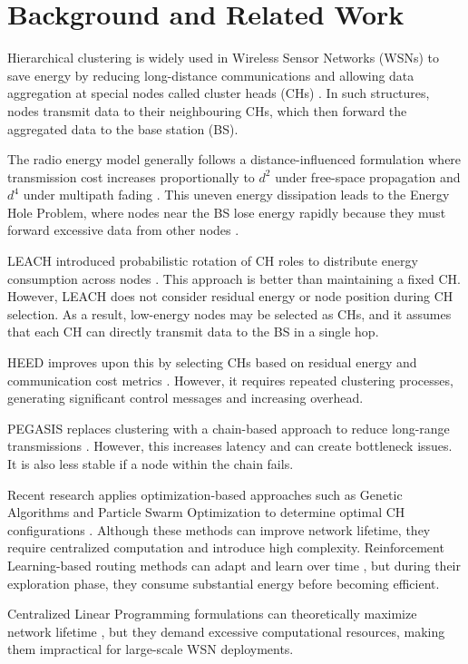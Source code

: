 \documentclass[conference]{IEEEtran}
\begin{document}
\section{Background and Related Work}

Hierarchical clustering is widely used in Wireless Sensor Networks (WSNs) to save energy by reducing long-distance communications and allowing data aggregation at special nodes called cluster heads (CHs) \cite{b5,b1}. In such structures, nodes transmit data to their neighbouring CHs, which then forward the aggregated data to the base station (BS). 

The radio energy model generally follows a distance-influenced formulation where transmission cost increases proportionally to $d^2$ under free-space propagation and $d^4$ under multipath fading \cite{b6}. This uneven energy dissipation leads to the Energy Hole Problem, where nodes near the BS lose energy rapidly because they must forward excessive data from other nodes \cite{b11}. 

LEACH introduced probabilistic rotation of CH roles to distribute energy consumption across nodes \cite{b6}. This approach is better than maintaining a fixed CH. However, LEACH does not consider residual energy or node position during CH selection. As a result, low-energy nodes may be selected as CHs, and it assumes that each CH can directly transmit data to the BS in a single hop. 

HEED improves upon this by selecting CHs based on residual energy and communication cost metrics \cite{b7}. However, it requires repeated clustering processes, generating significant control messages and increasing overhead. 

PEGASIS replaces clustering with a chain-based approach to reduce long-range transmissions \cite{b8}. However, this increases latency and can create bottleneck issues. It is also less stable if a node within the chain fails. 

Recent research applies optimization-based approaches such as Genetic Algorithms and Particle Swarm Optimization to determine optimal CH configurations \cite{b12}. Although these methods can improve network lifetime, they require centralized computation and introduce high complexity. Reinforcement Learning-based routing methods can adapt and learn over time \cite{b9,b10}, but during their exploration phase, they consume substantial energy before becoming efficient. 

Centralized Linear Programming formulations can theoretically maximize network lifetime \cite{b11}, but they demand excessive computational resources, making them impractical for large-scale WSN deployments. 
\end{document}
